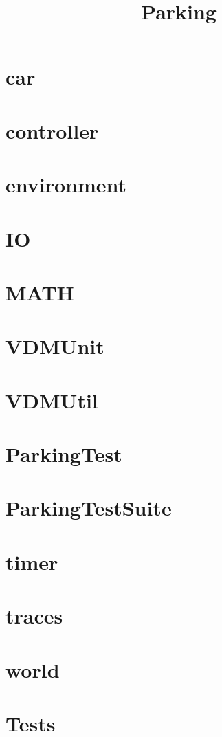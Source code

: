 \documentclass{article}
\begin{document}
\title{Parking}
\author{}
\maketitle
\tableofcontents

\section{car}


\section{controller}


\section{environment}


\section{IO}


\section{MATH}


\section{VDMUnit}


\section{VDMUtil}


\section{ParkingTest}


\section{ParkingTestSuite}


\section{timer}


\section{traces}


\section{world}


\section{Tests}

\end{document}
